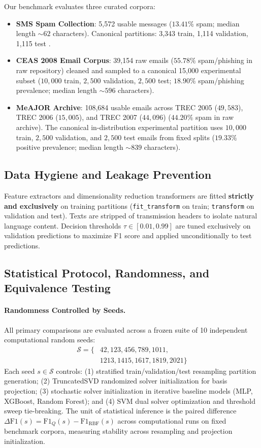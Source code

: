 \documentclass[10pt,twocolumn,letterpaper]{article}
\begin{document}
Our benchmark evaluates three curated corpora:
\begin{itemize}
    \item \textbf{SMS Spam Collection}: 5,572 usable messages ($13.41\%$ spam; median length $\sim 62$ characters). Canonical partitions: 3,343 train, 1,114 validation, 1,115 test \cite{almeida2011contributions}.
    \item \textbf{CEAS 2008 Email Corpus}: 39,154 raw emails ($55.78\%$ spam/phishing in raw repository) cleaned and sampled to a canonical 15,000 experimental subset ($10,000$ train, $2,500$ validation, $2,500$ test; $18.90\%$ spam/phishing prevalence; median length $\sim 596$ characters).
    \item \textbf{MeAJOR Archive}: 108,684 usable emails across TREC 2005 ($49,583$), TREC 2006 ($15,005$), and TREC 2007 ($44,096$) ($44.20\%$ spam in raw archive). The canonical in-distribution experimental partition uses $10,000$ train, $2,500$ validation, and $2,500$ test emails from fixed splits ($19.33\%$ positive prevalence; median length $\sim 839$ characters).
\end{itemize}

\subsection{Data Hygiene and Leakage Prevention}
Feature extractors and dimensionality reduction transformers are fitted \textbf{strictly and exclusively} on training partitions (\texttt{fit\_transform} on train; \texttt{transform} on validation and test). Texts are stripped of transmission headers to isolate natural language content. Decision thresholds $\tau \in [0.01, 0.99]$ are tuned exclusively on validation predictions to maximize F1 score and applied unconditionally to test predictions.

\subsection{Statistical Protocol, Randomness, and Equivalence Testing}
\paragraph{Randomness Controlled by Seeds.} All primary comparisons are evaluated across a frozen suite of 10 independent computational random seeds:
\begin{align}
\mathcal{S} = \{ & 42, 123, 456, 789, 1011, \nonumber \\
                 & 1213, 1415, 1617, 1819, 2021 \}
\end{align}
Each seed $s \in \mathcal{S}$ controls: (1) stratified train/validation/test resampling partition generation; (2) TruncatedSVD randomized solver initialization for basis projection; (3) stochastic solver initialization in iterative baseline models (MLP, XGBoost, Random Forest); and (4) SVM dual solver optimization and threshold sweep tie-breaking. The unit of statistical inference is the paired difference $\Delta\text{F1}(s) = \text{F1}_Q(s) - \text{F1}_{\text{RBF}}(s)$ across computational runs on fixed benchmark corpora, measuring stability across resampling and projection initialization.
\end{document}
